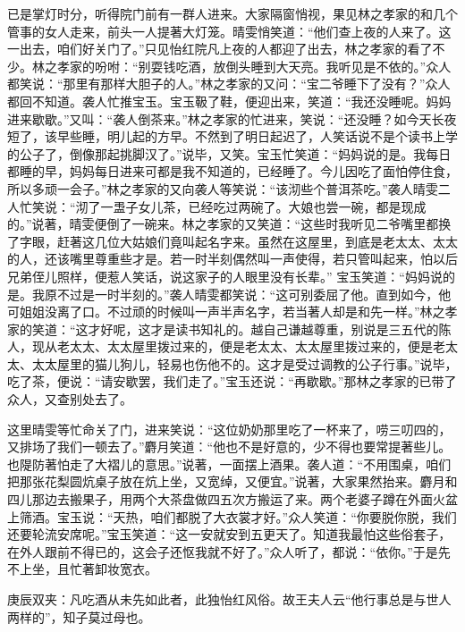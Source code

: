 \begin{parag}
    已是掌灯时分，听得院门前有一群人进来。大家隔窗悄视，果见林之孝家的和几个管事的女人走来，前头一人提著大灯笼。晴雯悄笑道：“他们查上夜的人来了。这一出去，咱们好关门了。”只见怡红院凡上夜的人都迎了出去，林之孝家的看了不少。林之孝家的吩咐：“别耍钱吃酒，放倒头睡到大天亮。我听见是不依的。”众人都笑说：“那里有那样大胆子的人。”林之孝家的又问：“宝二爷睡下了没有？”众人都回不知道。袭人忙推宝玉。宝玉靸了鞋，便迎出来，笑道：“我还没睡呢。妈妈进来歇歇。”又叫：“袭人倒茶来。”林之孝家的忙进来，笑说：“还没睡？如今天长夜短了，该早些睡，明儿起的方早。不然到了明日起迟了，人笑话说不是个读书上学的公子了，倒像那起挑脚汉了。”说毕，又笑。宝玉忙笑道：“妈妈说的是。我每日都睡的早，妈妈每日进来可都是我不知道的，已经睡了。今儿因吃了面怕停住食，所以多顽一会子。”林之孝家的又向袭人等笑说：“该沏些个普洱茶吃。”袭人晴雯二人忙笑说：“沏了一盄子女儿茶，已经吃过两碗了。大娘也尝一碗，都是现成的。”说著，晴雯便倒了一碗来。林之孝家的又笑道：“这些时我听见二爷嘴里都换了字眼，赶著这几位大姑娘们竟叫起名字来。虽然在这屋里，到底是老太太、太太的人，还该嘴里尊重些才是。若一时半刻偶然叫一声使得，若只管叫起来，怕以后兄弟侄儿照样，便惹人笑话，说这家子的人眼里没有长辈。” 宝玉笑道：“妈妈说的是。我原不过是一时半刻的。”袭人晴雯都笑说：“这可别委屈了他。直到如今，他可姐姐没离了口。不过顽的时候叫一声半声名字，若当著人却是和先一样。”林之孝家的笑道：“这才好呢，这才是读书知礼的。越自己谦越尊重，别说是三五代的陈人，现从老太太、太太屋里拨过来的，便是老太太、太太屋里拨过来的，便是老太太、太太屋里的猫儿狗儿，轻易也伤他不的。这才是受过调教的公子行事。”说毕，吃了茶，便说：“请安歇罢，我们走了。”宝玉还说：“再歇歇。”那林之孝家的已带了众人，又查别处去了。
\end{parag}


\begin{parag}
    这里晴雯等忙命关了门，进来笑说：“这位奶奶那里吃了一杯来了，唠三叨四的，又排场了我们一顿去了。”麝月笑道：“他也不是好意的，少不得也要常提著些儿。也隄防著怕走了大褶儿的意思。”说著，一面摆上酒果。袭人道：“不用围桌，咱们把那张花梨圆炕桌子放在炕上坐，又宽绰，又便宜。”说著，大家果然抬来。麝月和四儿那边去搬果子，用两个大茶盘做四五次方搬运了来。两个老婆子蹲在外面火盆上筛酒。宝玉说：“天热，咱们都脱了大衣裳才好。”众人笑道：“你要脱你脱，我们还要轮流安席呢。”宝玉笑道：“这一安就安到五更天了。知道我最怕这些俗套子，在外人跟前不得已的，这会子还怄我就不好了。”众人听了，都说：“依你。”于是先不上坐，且忙著卸妆宽衣。\begin{note}庚辰双夹：凡吃酒从未先如此者，此独怡红风俗。故王夫人云“他行事总是与世人两样的”，知子莫过母也。\end{note}
\end{parag}



